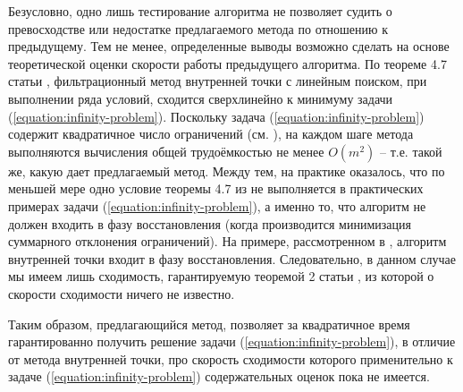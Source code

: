 \documentclass[a4paper, 10pt]{article}
\theoremstyle{definition}
\theoremstyle{plain}
\theoremstyle{plain}
\begin{document}
Безусловно, одно лишь тестирование алгоритма не позволяет судить о превосходстве
или недостатке предлагаемого метода по отношению к предыдущему. Тем не менее,
определенные выводы возможно сделать на основе теоретической оценки скорости
работы предыдущего алгоритма. По теореме 4.7 статьи \cite{WachterBiegler},
фильтрационный метод внутренней точки с линейным поиском, при выполнении ряда
условий, сходится сверхлинейно к минимуму задачи
(\ref{equation:infinity-problem}). Поскольку задача
(\ref{equation:infinity-problem}) содержит квадратичное число ограничений
(см. \cite{GardnerKiderlen,palachev}), на каждом шаге метода выполняются
вычисления общей трудоёмкостью не менее $O(m^2)$ -- т.е. такой же, какую дает
предлагаемый метод. Между тем, на практике оказалось, что по меньшей мере одно
условие теоремы 4.7 из \cite{WachterBiegler} не выполняется в практических
примерах задачи (\ref{equation:infinity-problem}), а именно то,
что алгоритм не должен входить в фазу восстановления (когда производится
минимизация суммарного отклонения ограничений). На примере, рассмотренном в
\cite{palachev}, алгоритм внутренней точки входит в фазу восстановления.
Следовательно, в данном случае мы имеем лишь сходимость, гарантируемую теоремой
2 статьи \cite{WachterBiegler2}, из которой о скорости сходимости ничего не
известно.

Таким образом, предлагающийся метод, позволяет за квадратичное время
гарантированно получить решение задачи (\ref{equation:infinity-problem}),
в отличие от метода внутренней точки, про
скорость сходимости которого применительно к задаче
(\ref{equation:infinity-problem}) содержательных оценок пока не имеется.
\end{document}
